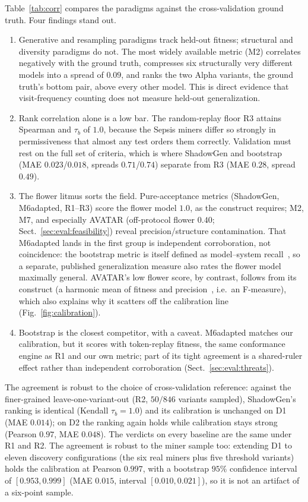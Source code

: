 \documentclass[runningheads]{llncs}
\newcommand{\chg}[1]{\textcolor{chgblue}{#1}}
\begin{document}
Table~\ref{tab:corr} compares the paradigms against the cross-validation ground truth. Four findings stand out.
\begin{enumerate}
  \item Generative and resampling paradigms track held-out fitness; structural and diversity paradigms do not. The most widely available metric (M2) correlates negatively with the ground truth, compresses six structurally very different models into a spread of \chg{$0.09$}, and \chg{ranks the two Alpha variants, the ground truth's bottom pair, above every other model}. This is direct evidence that visit-frequency counting does not measure held-out generalization.
  \item Rank correlation alone is a low bar. The random-replay floor R3 attains Spearman and $\tau_b$ of $1.0$, because the Sepsis miners differ so strongly in permissiveness that almost any test orders them correctly. Validation must rest on the full set of criteria, which is where \chg{ShadowGen} and bootstrap (MAE $0.023$/\chg{$0.018$}, spreads $0.71$/$0.74$) separate from R3 (MAE $0.28$, spread $0.49$).
  \item The flower litmus sorts the field. Pure-acceptance metrics (\chg{ShadowGen}, M6adapted, R1--R3) score the flower model $1.0$, as the construct requires; M2, M7, and \chg{especially AVATAR (off-protocol flower $0.40$; Sect.~\ref{sec:eval:feasibility})} reveal precision/structure contamination. That M6adapted lands in the first group is independent corroboration, not coincidence: the bootstrap metric is itself defined as model--system recall~\cite{polyvyanyy2022bootstrap}, so a separate, published generalization measure also rates the flower model maximally general. \chg{AVATAR's} low flower score, by contrast, follows from its construct (a harmonic mean of fitness and precision~\cite{theis2020avatar}, i.e.\ an F-measure), which also explains \chg{why it scatters off the calibration line (Fig.~\ref{fig:calibration})}.
  \item Bootstrap is the closest competitor, with a caveat. M6adapted matches our calibration, but it scores with token-replay fitness, the same conformance engine as R1 and our own metric; part of its tight agreement is a shared-ruler effect rather than independent corroboration (Sect.~\ref{sec:eval:threats}).
\end{enumerate}

The agreement is robust to the choice of cross-validation reference\chg{: against} the finer-grained leave-one-variant-out (R2\chg{, $50/846$ variants sampled}), ShadowGen's ranking is identical (Kendall $\tau_b{=}1.0$) and its calibration is unchanged on D1 (MAE $0.014$); on D2 the ranking again holds while calibration stays strong (Pearson $0.97$, MAE $0.048$). The verdicts on every baseline are the same under R1 and R2. \chg{The agreement is robust to the miner sample too: extending D1 to eleven discovery configurations (the six real miners plus five threshold variants) holds the calibration at Pearson $0.997$, with a bootstrap $95\%$ confidence interval of $[0.953, 0.999]$ (MAE $0.015$, interval $[0.010, 0.021]$), so it is not an artifact of a six-point sample.}
\end{document}
